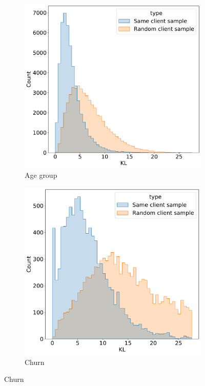 \documentclass[sigconf]{acmart}
\begin{document}
\begin{figure}
  \centering
  \begin{subfigure}{0.5\linewidth}
    \caption{Age group}
    \includegraphics[width=\linewidth]{figures/kl_dis_age_group.pdf}
  \end{subfigure}%
  \begin{subfigure}{0.5\linewidth}
    \caption{Churn}
    \includegraphics[width=\linewidth]{figures/kl_dis_churn.pdf}

\end{subfigure}
\end{figure}
\end{document}
